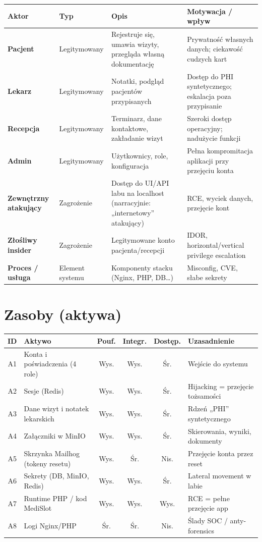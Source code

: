 \documentclass[11pt,a4paper]{article}
\begin{document}
\begin{tabularx}{\textwidth}{@{}>{\bfseries}p{2.6cm} l L L@{}}
\toprule
\normalfont\textbf{Aktor} & \textbf{Typ} & \textbf{Opis} & \textbf{Motywacja / wpływ} \\
\midrule
Pacjent & Legitymowany & Rejestruje się, umawia wizyty, przegląda własną dokumentację & Prywatność własnych danych; ciekawość cudzych kart \\
Lekarz & Legitymowany & Notatki, podgląd pacjentów przypisanych & Dostęp do PHI syntetycznego; eskalacja poza przypisanie \\
Recepcja & Legitymowany & Terminarz, dane kontaktowe, zakładanie wizyt & Szeroki dostęp operacyjny; nadużycie funkcji \\
Admin & Legitymowany & Użytkownicy, role, konfiguracja & Pełna kompromitacja aplikacji przy przejęciu konta \\
Zewnętrzny atakujący & Zagrożenie & Dostęp do UI/API labu na localhost (narracyjnie: „internetowy” atakujący) & RCE, wyciek danych, przejęcie kont \\
Złośliwy insider & Zagrożenie & Legitymowane konto pacjenta/recepcji & IDOR, horizontal/vertical privilege escalation \\
Proces / usługa & Element systemu & Komponenty stacku (Nginx, PHP, DB\ldots) & Misconfig, CVE, słabe sekrety \\
\bottomrule
\end{tabularx}

\section{Zasoby (aktywa)}

\begin{tabularx}{\textwidth}{@{}c L c c c L@{}}
\toprule
\textbf{ID} & \textbf{Aktywo} & \textbf{Pouf.} & \textbf{Integr.} & \textbf{Dostęp.} & \textbf{Uzasadnienie} \\
\midrule
A1 & Konta i poświadczenia (4 role) & Wys. & Wys. & Śr. & Wejście do systemu \\
A2 & Sesje (Redis) & Wys. & Wys. & Śr. & Hijacking = przejęcie tożsamości \\
A3 & Dane wizyt i notatek lekarskich & Wys. & Wys. & Śr. & Rdzeń „PHI” syntetycznego \\
A4 & Załączniki w MinIO & Wys. & Wys. & Śr. & Skierowania, wyniki, dokumenty \\
A5 & Skrzynka Mailhog (tokeny resetu) & Wys. & Śr. & Nis. & Przejęcie konta przez reset \\
A6 & Sekrety (DB, MinIO, Redis) & Wys. & Wys. & Śr. & Lateral movement w labie \\
A7 & Runtime PHP / kod MediSlot & Wys. & Wys. & Wys. & RCE = pełne przejęcie app \\
A8 & Logi Nginx/PHP & Śr. & Śr. & Nis. & Ślady SOC / anty-forensics \\
\bottomrule
\end{tabularx}
\end{document}

